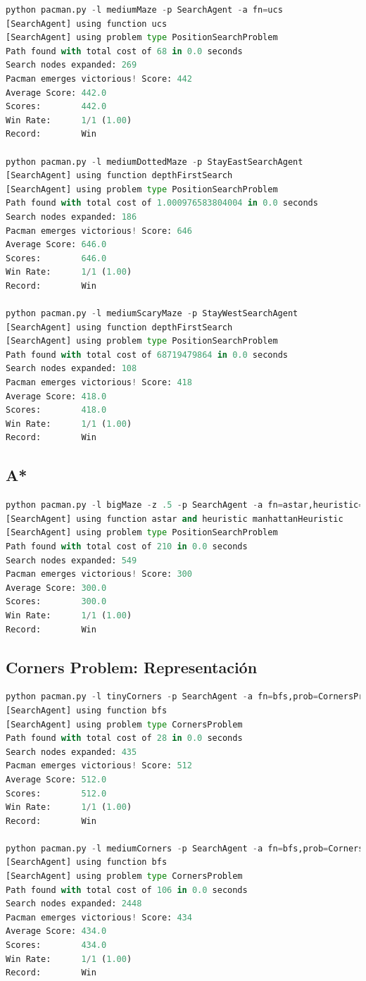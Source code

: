 \documentclass{report}
\begin{document}
          \begin{lstlisting}[language=Python, caption=Prueba UCS]
python pacman.py -l mediumMaze -p SearchAgent -a fn=ucs
[SearchAgent] using function ucs
[SearchAgent] using problem type PositionSearchProblem
Path found with total cost of 68 in 0.0 seconds
Search nodes expanded: 269
Pacman emerges victorious! Score: 442
Average Score: 442.0
Scores:        442.0
Win Rate:      1/1 (1.00)
Record:        Win

python pacman.py -l mediumDottedMaze -p StayEastSearchAgent
[SearchAgent] using function depthFirstSearch
[SearchAgent] using problem type PositionSearchProblem
Path found with total cost of 1.000976583804004 in 0.0 seconds
Search nodes expanded: 186
Pacman emerges victorious! Score: 646
Average Score: 646.0
Scores:        646.0
Win Rate:      1/1 (1.00)
Record:        Win

python pacman.py -l mediumScaryMaze -p StayWestSearchAgent
[SearchAgent] using function depthFirstSearch
[SearchAgent] using problem type PositionSearchProblem
Path found with total cost of 68719479864 in 0.0 seconds
Search nodes expanded: 108
Pacman emerges victorious! Score: 418
Average Score: 418.0
Scores:        418.0
Win Rate:      1/1 (1.00)
Record:        Win
          \end{lstlisting}
        \clearpage\subsection{A*}
          \begin{lstlisting}[language=Python, caption=Prueba A*]
python pacman.py -l bigMaze -z .5 -p SearchAgent -a fn=astar,heuristic=manhattanHeuristic
[SearchAgent] using function astar and heuristic manhattanHeuristic
[SearchAgent] using problem type PositionSearchProblem
Path found with total cost of 210 in 0.0 seconds
Search nodes expanded: 549
Pacman emerges victorious! Score: 300
Average Score: 300.0
Scores:        300.0
Win Rate:      1/1 (1.00)
Record:        Win
          \end{lstlisting}
        \clearpage\subsection{Corners Problem: Representación}
          \begin{lstlisting}[language=Python, caption=Prueba Representación Corners Problem]
python pacman.py -l tinyCorners -p SearchAgent -a fn=bfs,prob=CornersProblem
[SearchAgent] using function bfs
[SearchAgent] using problem type CornersProblem
Path found with total cost of 28 in 0.0 seconds
Search nodes expanded: 435
Pacman emerges victorious! Score: 512
Average Score: 512.0
Scores:        512.0
Win Rate:      1/1 (1.00)
Record:        Win

python pacman.py -l mediumCorners -p SearchAgent -a fn=bfs,prob=CornersProblem
[SearchAgent] using function bfs
[SearchAgent] using problem type CornersProblem
Path found with total cost of 106 in 0.0 seconds
Search nodes expanded: 2448
Pacman emerges victorious! Score: 434
Average Score: 434.0
Scores:        434.0
Win Rate:      1/1 (1.00)
Record:        Win
          \end{lstlisting}
\end{document}
